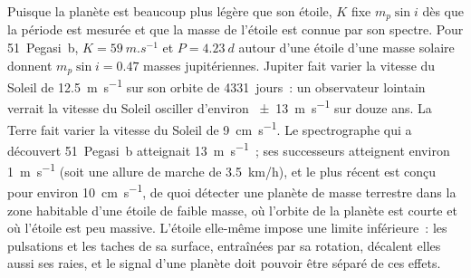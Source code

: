 Puisque la planète est beaucoup plus légère que son étoile, $K$ fixe $m_p\sin i$
dès que la période est mesurée et que la masse de l'étoile est connue par son
spectre. Pour 51~Pegasi~b, $K = \qty{59}{m.s^{-1}}$ et $P = \qty{4.23}{d}$
autour d'une étoile d'une masse solaire donnent $m_p\sin i = 0.47$ masses jupitériennes.
Jupiter fait varier la vitesse du Soleil de \qty{12.5}{m.s^{-1}} sur son
orbite de \num{4331}~jours~: un observateur lointain verrait la vitesse du Soleil
osciller d'environ \qty{\pm 13}{m.s^{-1}} sur douze ans. La Terre fait varier la vitesse du Soleil de
\qty{9}{cm.s^{-1}}. Le spectrographe qui a découvert 51~Pegasi~b atteignait
\qty{13}{m.s^{-1}}~; ses successeurs atteignent environ \qty{1}{m.s^{-1}} (soit
une allure de marche de \qty{3.5}{km/h}), et le plus récent est conçu pour environ
\qty{10}{cm.s^{-1}}, de quoi détecter une planète de masse terrestre dans la zone
habitable d'une étoile de faible masse, où l'orbite de la planète est courte et où l'étoile est peu massive.
L'étoile elle-même impose une limite inférieure~: les pulsations et les taches de sa surface,
entraînées par sa rotation, décalent elles aussi ses raies, et le signal d'une planète
doit pouvoir être séparé de ces effets.

\begin{omfigure}
\centering
{}
\par{}\label{fig:b3:exoplanets:rv}
\end{omfigure}

